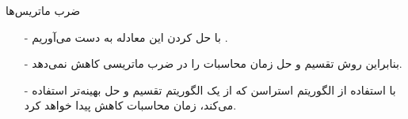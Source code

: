 \begin{frame}{‌ضرب ماتریس‌ها}
\begin{itemize}\itemr
\item[-]
با حل کردن این معادله به دست می‌آوریم
.
\item[-]
بنابراین روش تقسیم و حل زمان محاسبات را در ضرب ماتریسی کاهش نمی‌دهد.
\item[-]
با استفاده از الگوریتم استراسن
که از یک الگوریتم تقسیم و حل بهینه‌تر استفاده می‌کند، زمان محاسبات کاهش پیدا خواهد کرد.
\end{itemize}
\end{frame}